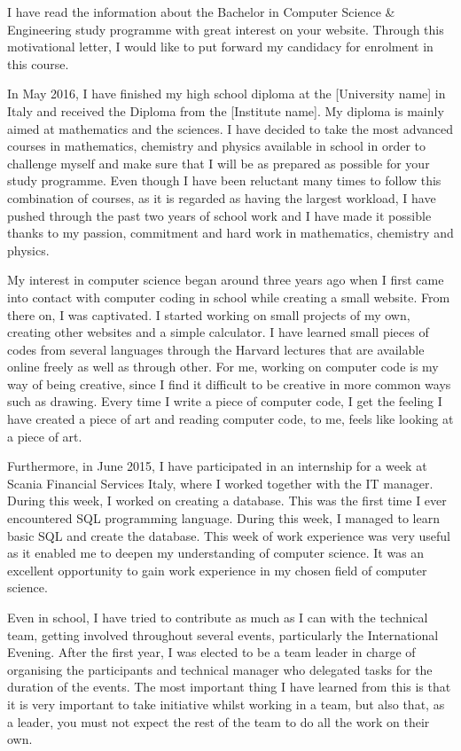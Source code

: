 I have read the information about the Bachelor in Computer Science & Engineering study programme with great interest on your website. Through this motivational letter, I would like to put forward my candidacy for enrolment in this course.

In May 2016, I have finished my high school diploma at the [University name] in Italy and received the Diploma from the [Institute name]. My diploma is mainly aimed at mathematics and the sciences. I have decided to take the most advanced courses in mathematics, chemistry and physics available in school in order to challenge myself and make sure that I will be as prepared as possible for your study programme. Even though I have been reluctant many times to follow this combination of courses, as it is regarded as having the largest workload, I have pushed through the past two years of school work and I have made it possible thanks to my passion, commitment and hard work in mathematics, chemistry and physics.

My interest in computer science began around three years ago when I first came into contact with computer coding in school while creating a small website. From there on, I was captivated. I started working on small projects of my own, creating other websites and a simple calculator. I have learned small pieces of codes from several languages through the Harvard lectures that are available online freely as well as through other. For me, working on computer code is my way of being creative, since I find it difficult to be creative in more common ways such as drawing. Every time I write a piece of computer code, I get the feeling I have created a piece of art and reading computer code, to me, feels like looking at a piece of art.

Furthermore, in June 2015, I have participated in an internship for a week at Scania Financial Services Italy, where I worked together with the IT manager. During this week, I worked on creating a database. This was the first time I ever encountered SQL programming language. During this week, I managed to learn basic SQL and create the database. This week of work experience was very useful as it enabled me to deepen my understanding of computer science. It was an excellent opportunity to gain work experience in my chosen field of computer science.

Even in school, I have tried to contribute as much as I can with the technical team, getting involved throughout several events, particularly the International Evening. After the first year, I was elected to be a team leader in charge of organising the participants and technical manager who delegated tasks for the duration of the events. The most important thing I have learned from this is that it is very important to take initiative whilst working in a team, but also that, as a leader, you must not expect the rest of the team to do all the work on their own.


